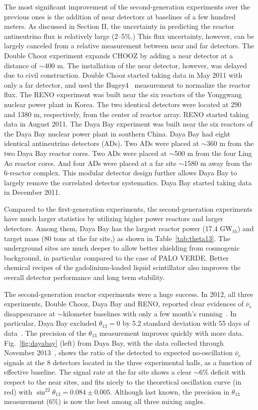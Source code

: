 The most significant improvement of the second-generation experiments over the previous ones is the addition of near detectors at baselines of a few hundred meters. 
As discussed in Section II, the uncertainty in predicting the reactor antineutrino flux is relatively large (2--5\%.) 
This flux uncertainty, however, can be largely canceled from a relative measurement between near and far detectors. 
The Double Chooz experiment expands CHOOZ by adding a near detector at a distance of $\sim$400 m. 
The installation of the near detector, however, was delayed due to civil construction. 
Double Chooz started taking data in May 2011 with only a far detector, and used the Bugey4~\cite{Bugey4} measurement to normalize the reactor flux. 
The RENO experiment was built near the six reactors of the Yonggwang nuclear power plant in Korea. 
The two identical detectors were located at 290 and 1380 m, respectively, from the center of reactor array. 
RENO started taking data in August 2011. 
The Daya Bay experiment was built near the six reactors of the Daya Bay nuclear power plant in southern China. 
Daya Bay had eight identical antineutrino detectors (ADs). 
Two ADs were placed at $\sim$360 m from the two  Daya Bay reactor cores. 
Two ADs were placed at $\sim$500 m from the four Ling Ao reactor cores. 
And four ADs were placed at a far site $\sim$1580 m away from the 6-reactor complex. 
This modular detector design further allows Daya Bay to largely remove the correlated detector systematics. 
Daya Bay started taking data in December 2011.

Compared to the first-generation experiments, the second-generation experiments have much larger statistics by utilizing higher power reactors and larger detectors. Among them, Daya Bay has the largest reactor power (17.4 GW$_{th}$) and target mass (80 tons at the far site,) as shown in Table~\ref{tab:theta13}. 
The underground sites are much deeper to allow better shielding from cosmogenic background, in particular compared to the case of PALO VERDE. 
Better chemical recipes of the gadolinium-loaded liquid scintillator also improves the overall detector performance and long term stability.

The second-generation reactor experiments were a huge success. 
In 2012, all three experiments, Double Chooz, Daya Bay and RENO, reported clear evidences of $\bar\nu_{e}$ disappearance at $\sim$kilometer baselines with only a few month's running~\cite{DChooz,Reno,Dayabay}. 
In particular, Daya Bay excluded $\theta_{13}=0$ by 5.2 standard deviation with 55 days of data~\cite{Dayabay}. 
The precision of the $\theta_{13}$ measurement improves quickly with more data.
Fig.~\ref{fig:dayabay} (left) from Daya Bay, with the data collected through November 2013~\cite{Zhang-Neutrino14}, shows the ratio of the detected to expected no-oscillation $\bar\nu_{e}$ signals at the 8 detectors located in the three experimental halls, as a function of effective baseline.
The signal rate at the far site shows a clear $\sim$6\% deficit with respect to the near sites, and fits nicely to the theoretical oscillation curve (in red) with $\sin^22\theta_{13} = 0.084 \pm 0.005$. 
Although last known, the precision in $\theta_{13}$ measurement (6\%) is now the best among all three mixing angles.

